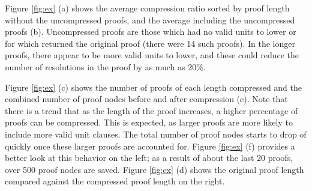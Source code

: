 
Figure \ref{fig:ex} (a) shows the average compression ratio sorted by proof length without the uncompressed proofs, and the average including the uncompressed proofs (b). Uncompressed proofs are those which had no valid units to lower or for which \SFOLowerUnits returned the original proof (there were 14 such proofs). In the longer proofs, there appear to be more valid units to lower, and these could reduce the number of resolutions in the proof by as much as 20\%.

Figure \ref{fig:ex} (c) shows the number of proofs of each length compressed and the combined number of proof nodes before and after compression (e). Note that there is a trend that as the length of the proof increases, a higher percentage of proofs can be compressed. This is expected, as larger proofs are more likely to include more valid unit clauses. The total number of proof nodes starts to drop of quickly once these larger proofs are accounted for. Figure \ref{fig:ex} (f) provides a better look at this behavior on the left; as a result of about the last 20 proofs, over 500 proof nodes are saved. Figure \ref{fig:ex} (d) shows the original proof length compared against the compressed proof length on the right.






